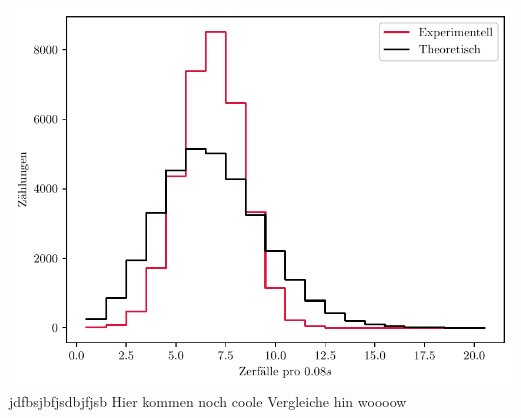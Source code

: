 \documentclass{article}
\begin{document}
\begin{center}
	\includegraphics[scale=0.8]{Q67_500V_Poi.pdf}\\
	jdfbsjbfjsdbjfjsb Hier kommen noch coole Vergleiche hin woooow
	\end{center}
	\newpage
\end{document}

